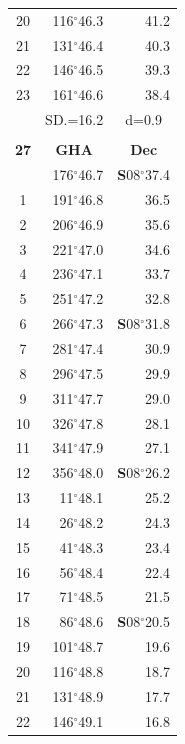 \documentclass[10pt, a4paper]{report}
\begin{document}
\begin{scriptsize}
\begin{tabular*}{0.2\textwidth}[t]{@{\extracolsep{\fill}}|c|rr|}
20 & 116$^\circ$46.3 & 41.2\\
21 & 131$^\circ$46.4 & \raisebox{0.24ex}{\boldmath$\cdot$~\boldmath$\cdot$~~}40.3\\
22 & 146$^\circ$46.5 & 39.3\\
23 & 161$^\circ$46.6 & 38.4\\
\hline
\rule{0pt}{2.4ex} & \multicolumn{1}{c}{SD.=16.2} & \multicolumn{1}{c|}{d=0.9}\\
\hline
\multicolumn{1}{c}{}\\[-0.5ex]\hline
\multicolumn{1}{|c|}{\rule{0pt}{2.6ex}\textbf{27}} & \multicolumn{1}{c}{\textbf{GHA}} & \multicolumn{1}{c|}{\textbf{Dec}}\\
\hline\rule{0pt}{2.6ex}\noindent
0 & 176$^\circ$46.7 & \textbf{S}08$^\circ$37.4\\
1 & 191$^\circ$46.8 & 36.5\\
2 & 206$^\circ$46.9 & 35.6\\
3 & 221$^\circ$47.0 & \raisebox{0.24ex}{\boldmath$\cdot$~\boldmath$\cdot$~~}34.6\\
4 & 236$^\circ$47.1 & 33.7\\
5 & 251$^\circ$47.2 & 32.8\\[2Pt]
6 & 266$^\circ$47.3 & \textbf{S}08$^\circ$31.8\\
7 & 281$^\circ$47.4 & 30.9\\
8 & 296$^\circ$47.5 & 29.9\\
9 & 311$^\circ$47.7 & \raisebox{0.24ex}{\boldmath$\cdot$~\boldmath$\cdot$~~}29.0\\
10 & 326$^\circ$47.8 & 28.1\\
11 & 341$^\circ$47.9 & 27.1\\[2Pt]
12 & 356$^\circ$48.0 & \textbf{S}08$^\circ$26.2\\
13 & 11$^\circ$48.1 & 25.2\\
14 & 26$^\circ$48.2 & 24.3\\
15 & 41$^\circ$48.3 & \raisebox{0.24ex}{\boldmath$\cdot$~\boldmath$\cdot$~~}23.4\\
16 & 56$^\circ$48.4 & 22.4\\
17 & 71$^\circ$48.5 & 21.5\\[2Pt]
18 & 86$^\circ$48.6 & \textbf{S}08$^\circ$20.5\\
19 & 101$^\circ$48.7 & 19.6\\
20 & 116$^\circ$48.8 & 18.7\\
21 & 131$^\circ$48.9 & \raisebox{0.24ex}{\boldmath$\cdot$~\boldmath$\cdot$~~}17.7\\
22 & 146$^\circ$49.1 & 16.8\\

\end{tabular*}
\end{scriptsize}
\end{document}
